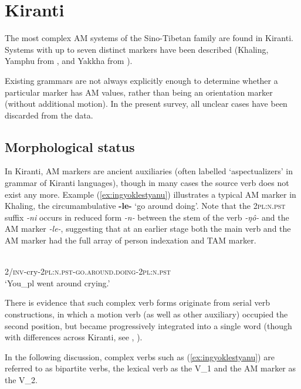 \documentclass[oneside,a4paper,11pt]{article}
\newcommand{\ipa}[1]{{\phon\textit{#1}}}
\begin{document}
\section{Kiranti} 
The most complex AM systems of the Sino-Tibetan family are found in Kiranti. Systems with up to seven distinct markers have been described (Khaling, Yamphu from \citealt[137-194]{rutgers98yamphu}, and Yakkha from \citealt[283-328]{schackow15yakkha}).

Existing grammars are not always explicitly enough to determine whether a particular marker has AM values, rather than being an orientation marker (without additional motion). In the present survey, all unclear cases have been discarded from the data.  

\subsection{Morphological status}

In Kiranti, AM markers are ancient auxiliaries (often labelled `aspectualizers' in grammar of Kiranti languages), though in many cases the source verb does not exist any more.  Example (\ref{ex:ingyoklestyanu}) illustrates a typical AM marker in Khaling, the circumambulative \textbf{-le-} `go around doing'. Note that the \textsc{2pl:n.pst} suffix \ipa{-ni} occurs in reduced form \ipa{-n-} between the stem of the verb \ipa{-ŋô-} and  the AM marker \ipa{-le-}, suggesting that at an earlier stage both the main verb and the AM marker had the full array of person indexation and TAM marker.

\begin{exe}
\ex \label{ex:ingyoklestyanu}
\gll \ipa{ʔi-ŋô-n-\textbf{le}-ni} \\
2/\textsc{inv}-cry-\textsc{2pl:n.pst}-\textsc{go.around.doing}-\textsc{2pl:n.pst} \\
\glt `You_{pl} went around crying.' 
\end{exe}

There is evidence that such complex verb forms originate from serial verb constructions, in which a motion verb (as well as other auxiliary) occupied the second position, but became progressively integrated into a single word (though with differences across Kiranti, see \citealt{bickel07chintang}, \citealt{schiering10prosodic}). 

In the following discussion, complex verbs such as (\ref{ex:ingyoklestyanu}) are referred to as bipartite verbs, the lexical verb as the V_1 and the AM marker as the V_2.
\end{document}
